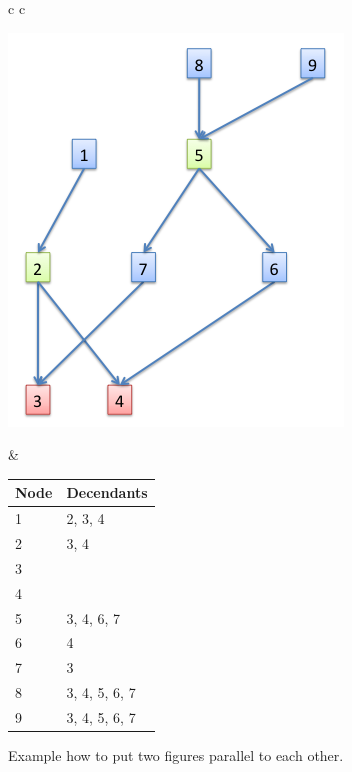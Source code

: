 \documentclass[estonian,english]{unitartucs-thesis} %
\begin{document}
\begin{figure} [htbp]
\begin{tabular}{c c}
%
\begin{minipage}{0.45\textwidth}
\includegraphics[width=\textwidth]{LCA_2_solutions}
\end{minipage}
%
&
\begin{minipage}{0.55\textwidth}
\centering
\begin{tabular}{ l | l |}
	Node & Decendants \\ \hline
  1 & 2, 3, 4 \\ \hline
  2 & 3, 4 \\ \hline
  3 & \\ \hline
  4 & \\ \hline
  5 & 3, 4, 6, 7 \\ \hline
  6 & 4 \\ \hline
  7 & 3 \\  \hline
  8 & 3, 4, 5, 6, 7\\ \hline
  9 & 3, 4, 5, 6, 7\\ \hline
\end{tabular}
\end{minipage}
\end{tabular}
%
\caption{Example how to put two figures parallel to each other.}
\label{fig:LCA_2_solutions}
\end{figure}
\end{document}
